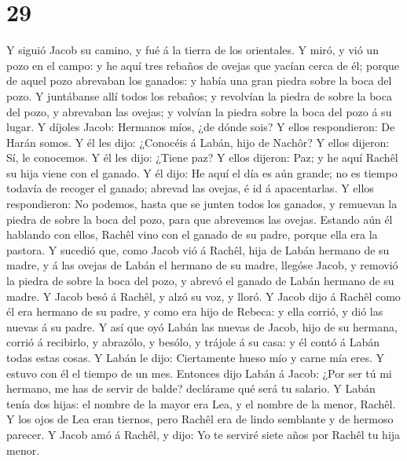 \hypertarget{section-28}{%
\section{29}\label{section-28}}

 Y siguió Jacob su camino, y fué á la tierra de los
orientales.  Y miró, y vió un pozo en el campo: y he aquí
tres rebaños de ovejas que yacían cerca de él; porque de aquel pozo
abrevaban los ganados: y había una gran piedra sobre la boca del pozo.
 Y juntábanse allí todos los rebaños; y revolvían la
piedra de sobre la boca del pozo, y abrevaban las ovejas; y volvían la
piedra sobre la boca del pozo á su lugar.  Y díjoles
Jacob: Hermanos míos, ¿de dónde sois? Y ellos respondieron: De Harán
somos.  Y él les dijo: ¿Conocéis á Labán, hijo de Nachôr?
Y ellos dijeron: Sí, le conocemos.  Y él les dijo: ¿Tiene
paz? Y ellos dijeron: Paz; y he aquí Rachêl su hija viene con el ganado.
 Y él dijo: He aquí el día es aún grande; no es tiempo
todavía de recoger el ganado; abrevad las ovejas, é id á apacentarlas.
 Y ellos respondieron: No podemos, hasta que se junten
todos los ganados, y remuevan la piedra de sobre la boca del pozo, para
que abrevemos las ovejas.  Estando aún él hablando con
ellos, Rachêl vino con el ganado de su padre, porque ella era la
pastora.  Y sucedió que, como Jacob vió á Rachêl, hija de
Labán hermano de su madre, y á las ovejas de Labán el hermano de su
madre, llegóse Jacob, y removió la piedra de sobre la boca del pozo, y
abrevó el ganado de Labán hermano de su madre.  Y Jacob
besó á Rachêl, y alzó su voz, y lloró.  Y Jacob dijo á
Rachêl como él era hermano de su padre, y como era hijo de Rebeca: y
ella corrió, y dió las nuevas á su padre.  Y así que oyó
Labán las nuevas de Jacob, hijo de su hermana, corrió á recibirlo, y
abrazólo, y besólo, y trájole á su casa: y él contó á Labán todas estas
cosas.  Y Labán le dijo: Ciertamente hueso mío y carne
mía eres. Y estuvo con él el tiempo de un mes.  Entonces
dijo Labán á Jacob: ¿Por ser tú mi hermano, me has de servir de balde?
declárame qué será tu salario.  Y Labán tenía dos hijas:
el nombre de la mayor era Lea, y el nombre de la menor, Rachêl.
 Y los ojos de Lea eran tiernos, pero Rachêl era de lindo
semblante y de hermoso parecer.  Y Jacob amó á Rachêl, y
dijo: Yo te serviré siete años por Rachêl tu hija menor. 
